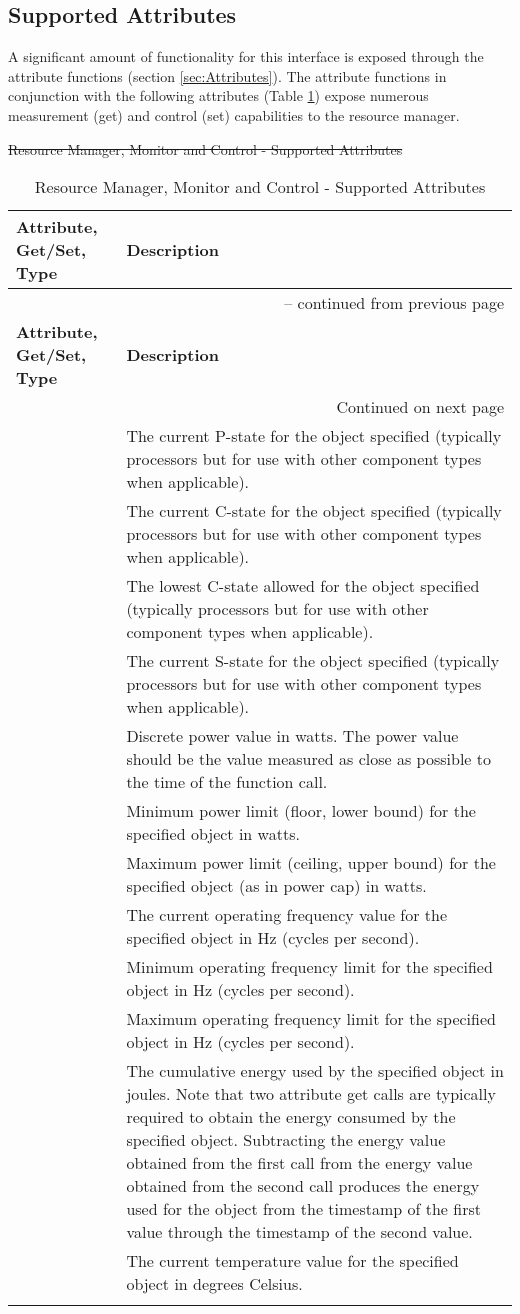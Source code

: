 \documentclass[12pt]{report} %
\makeatletter
\def\PWR#1{\texttt{PWR\_{#1}}}%
\def\attributetablename{} %
\def\attributetablelabel{} %
\def\attriblist{} %
\newenvironment{attributetable}[2]{ %
        \def\attributetablename{#1} %
	\def\attributetablelabel{#2} %
}{ %
	\begin{longtable}{ | p{6.3cm} | p{6.6cm} |} %
	\caption{\attributetablename}\label{\attributetablelabel}\\ %
	\hline											%
	\textbf{Attribute, Get/Set, Type}& \textbf{Description}\\  				%
	\hline											%
	\endfirsthead					 %
	\multicolumn{2}{r}{{ \small{\tablename\ \thetable{} -- continued from previous page}}}\\%
	\hline											%
	\textbf{Attribute, Get/Set, Type} & \textbf{Description}\\ 				%
	\hline											%
	\endhead %
	\hline											%
	\multicolumn{2}{r}{\small{{Continued on next page}}} \\					%
	\endfoot %
	\hline											%
	\endlastfoot										 %
	\attriblist %
	\hline %
	\end{longtable} %
}
\def\attribute#1#2#3#4{ %
	\edef\attriblist{%
		\unexpanded\expandafter{\attriblist}%
		\unexpanded{ \hline #1 \newline .\quad #2 \newline .\quad #3 & #4 \index{ATTR\_#1@\PWR{ATTR\_\uppercase{#1}}\textit{(attribute)}}\\ }%
	}%
}
\def\aG{Get} %
\def\aGS{Get/Set} %
\def\uint{\small{\texttt{uint64\_t}}} %
\def\dbl{\small{\texttt{double}}} %
\newcommand{\aPstateDesc}{%
	\attribute{PstateDesc}		{ \aGS }{ \uint }{ The current P-state for the object specified (typically processors but for use with other component types when applicable).  }%
}
\newcommand{\aCstateDesc}{%
	\attribute{CstateDesc}		{ \aGS }{ \uint }{ The current C-state for the object specified (typically processors but for use with other component types when applicable).  }%
}
\newcommand{\aCstateLimitDesc}{%
	\attribute{CstateLimitDesc}	{\aGS}{\uint}{The lowest C-state allowed for the object specified (typically processors but for use with other component types when applicable).}%
}
\newcommand{\aSstateDesc}{%
	\attribute{SstateDesc}		{\aGS}{\uint}{The current S-state for the object specified (typically processors but for use with other component types when applicable).}%
}
\newcommand{\aPowerDesc}{%
	\attribute{PowerDesc}		{\aG }{\dbl }{Discrete power value in watts. The power value should be the value measured as close as possible to the time of the function call.}%
}
\newcommand{\aMaxPowerDesc}{%
	\attribute{MaxPowerDesc}	{\aGS}{\dbl }{Maximum power limit (ceiling, upper bound) for the specified object (as in power cap) in watts.}%
} %
\newcommand{\aMinPowerDesc}{%
	\attribute{MinPowerDesc}	{\aGS}{\dbl }{Minimum power limit (floor, lower bound) for the specified object in watts.}%
} %
\newcommand{\aFreqLimitMinDesc}{%
	\attribute{FreqLimitMinDesc}	{\aGS}{\dbl }{Minimum operating frequency limit for the specified object in Hz (cycles per second).}%
} %
\newcommand{\aFreqLimitMaxDesc}{%
	\attribute{FreqLimitMaxDesc}	{\aGS}{\dbl }{Maximum operating frequency limit for the specified object in Hz (cycles per second).}%
} %
\newcommand{\aFreqDesc}{%
	\attribute{FreqDesc}		{\aGS}{\dbl }{The current operating frequency value for the specified object in Hz (cycles per second).} %
} %
\newcommand{\aEnergyDesc}{%
	\attribute{EnergyDesc}		{\aG }{\dbl }{The cumulative energy used by the specified object in joules. Note that two attribute get calls are typically required to obtain the energy consumed by the specified object. Subtracting the energy value obtained from the first call from the energy value obtained from the second call produces the energy used for the object from the timestamp of the first value through the timestamp of the second value.}%
} %
\newcommand{\aTempDesc}{%
	\attribute{TempDesc}		{\aG }{\dbl }{The current temperature value for the specified object in degrees Celsius.}%
} %
\providecommand{\DIFdeltex}[1]{{\protect\color{red}\sout{#1}}}                      %
\providecommand{\DIFaddbegin}{} %
\providecommand{\DIFaddend}{} %
\providecommand{\DIFdelbegin}{} %
\providecommand{\DIFdelend}{} %
\providecommand{\DIFdel}[1]{\texorpdfstring{\DIFdeltex{#1}}{}} %
\newcommand{\DIFscaledelfig}{0.5}
\newlength{\DIFdelgraphicswidth} %
\newlength{\DIFdelgraphicsheight} %
\newcommand{\DIFaddincludegraphics}[2][]{{\color{blue}\fbox{\DIFOincludegraphics[#1]{#2}}}} %
\newcommand{\DIFdelincludegraphics}[2][]{%
\sbox{\DIFdelgraphicsbox}{\DIFOincludegraphics[#1]{#2}}%
\settoboxwidth{\DIFdelgraphicswidth}{\DIFdelgraphicsbox} %
\settoboxtotalheight{\DIFdelgraphicsheight}{\DIFdelgraphicsbox} %
\scalebox{\DIFscaledelfig}{%
\parbox[b]{\DIFdelgraphicswidth}{\usebox{\DIFdelgraphicsbox}\\[-\baselineskip] \rule{\DIFdelgraphicswidth}{0em}}\llap{\resizebox{\DIFdelgraphicswidth}{\DIFdelgraphicsheight}{%
\setlength{\unitlength}{\DIFdelgraphicswidth}%
\begin{picture}(1,1)%
\thicklines\linethickness{2pt} %
{\color[rgb]{1,0,0}\put(0,0){\framebox(1,1){}}}%
{\color[rgb]{1,0,0}\put(0,0){\line( 1,1){1}}}%
{\color[rgb]{1,0,0}\put(0,1){\line(1,-1){1}}}%
\end{picture}%
}\hspace*{3pt}}} %
} %
\DeclareRobustCommand{\DIFaddbegin}{\DIFOaddbegin \let\includegraphics\DIFaddincludegraphics} %
\DeclareRobustCommand{\DIFaddend}{\DIFOaddend \let\includegraphics\DIFOincludegraphics} %
\DeclareRobustCommand{\DIFdelbegin}{\DIFOdelbegin \let\includegraphics\DIFdelincludegraphics} %
\DeclareRobustCommand{\DIFdelend}{\DIFOaddend \let\includegraphics\DIFOincludegraphics} %
\makeatother
\begin{document}
\subsection{Supported Attributes}\label{sec:RMMCAttributes}
\DIFdelbegin %
\DIFdelend A significant amount of functionality for this interface is exposed through the attribute functions (section \ref{sec:Attributes}).
The attribute functions in conjunction with the following attributes (Table \ref{table:RMMC}) expose numerous measurement  (get) and control (set) capabilities to the resource manager.

\DIFdelbegin %
{%
\DIFdel{Resource Manager, Monitor and Control - Supported Attributes }}%
\DIFdelend \DIFaddbegin \begin{attributetable}{Resource Manager, Monitor and Control - Supported Attributes }{table:RMMC}
	\aPstateDesc
	\aCstateDesc
	\aCstateLimitDesc
	\aSstateDesc
	\aPowerDesc
	\aMinPowerDesc
	\aMaxPowerDesc
	\aFreqDesc
	\aFreqLimitMinDesc
	\aFreqLimitMaxDesc
	\aEnergyDesc
	\aTempDesc
\end{attributetable}
\DIFaddend 


\DIFdelbegin %
\end{document}
